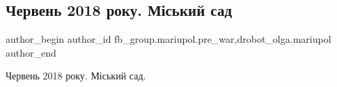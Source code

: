  
 
 
 
 

\subsection{Червень 2018 року. Міський сад}
\label{sec:09_02_2023.fb.fb_group.mariupol.pre_war.8.cherven_2018_roku__m}
 
\ifcmt
 author_begin
   author_id fb_group.mariupol.pre_war,drobot_olga.mariupol
 author_end
\fi

Червень 2018 року. Міський сад.
